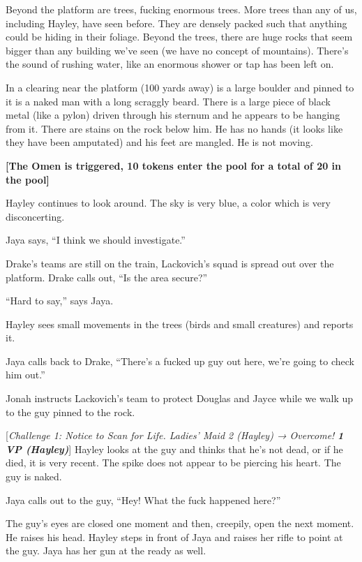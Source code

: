 Beyond the platform are trees, fucking enormous trees.  More trees than any of us, including Hayley, have seen before.  They are densely packed such that anything could be hiding in their foliage.  Beyond the trees, there are huge rocks that seem bigger than any building we've seen (we have no concept of mountains).  There's the sound of rushing water, like an enormous shower or tap has been left on.  



In a clearing near the platform (100 yards away) is a large boulder and pinned to it is a naked man with a long scraggly beard.  There is a large piece of black metal (like a pylon) driven through his sternum and he appears to be hanging from it. There are stains on the rock below him.  He has no hands (it looks like they have been amputated) and his feet are mangled.  He is not moving.



\textbf{{[}The Omen is triggered, 10 tokens enter the pool for a total of 20 in the pool{]}}



Hayley continues to look around.  The sky is very blue, a color which is very disconcerting.

Jaya says, ``I think we should investigate.''

Drake's teams are still on the train, Lackovich's squad is spread out over the platform.  Drake calls out, ``Is the area secure?''

``Hard to say,'' says Jaya.  

Hayley sees small movements in the trees (birds and small creatures) and reports it.  

Jaya calls back to Drake, ``There's a fucked up guy out here, we're going to check him out.''

Jonah instructs Lackovich's team to protect Douglas and Jayce while we walk up to the guy pinned to the rock.



{[}\textit{Challenge 1: Notice to Scan for Life.  Ladies' Maid 2 (Hayley) → Overcome! }\textit{\textbf{1 VP (Hayley)}}{]}  Hayley looks at the guy and thinks that he's not dead, or if he died, it is very recent.  The spike does not appear to be piercing his heart.  The guy is naked.

Jaya calls out to the guy, ``Hey!  What the fuck happened here?''

The guy's eyes are closed one moment and then, creepily, open the next moment. He raises his head.  Hayley steps in front of Jaya and raises her rifle to point at the guy.  Jaya has her gun at the ready as well.

